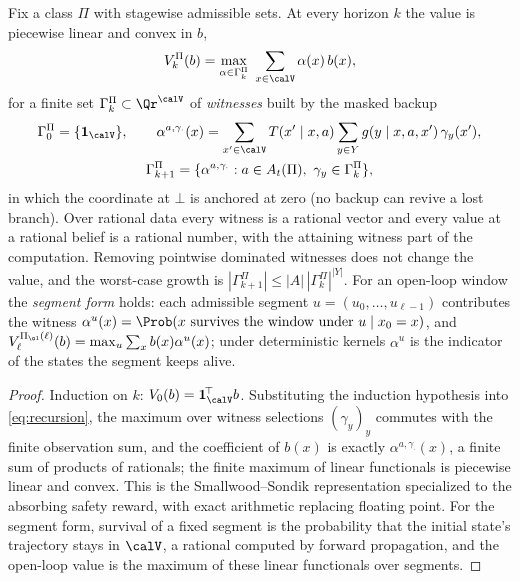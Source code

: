 \begin{proposition}\label{prop:alpha}
Fix a class $\Pi$ with stagewise admissible sets. At every horizon $k$ the value is piecewise linear and convex in $b$,
\[
V^{\Pi}_k(b)=\max_{\alpha\in\Gamma^{\Pi}_k}\ \sum_{x\in\calV}\alpha(x)\,b(x),
\]
for a finite set $\Gamma^{\Pi}_k\subset\Qr^{\calV}$ of \emph{witnesses} built by the masked backup
\begin{equation}\label{eq:backup}
\begin{gathered}
\Gamma^{\Pi}_0=\{\mathbf 1_{\calV}\},\qquad
\alpha^{a,\gamma_{\cdot}}(x)=\sum_{x'\in\calV}T(x'\mid x,a)\sum_{y\in Y}g(y\mid x,a,x')\,\gamma_y(x'),\\
\Gamma^{\Pi}_{k+1}=\{\alpha^{a,\gamma_{\cdot}}:a\in A_t(\Pi),\ \gamma_y\in\Gamma^{\Pi}_k\},
\end{gathered}
\end{equation}
in which the coordinate at $\bot$ is anchored at zero (no backup can revive a lost branch). Over rational data every witness is a rational vector and every value at a rational belief is a rational number, with the attaining witness part of the computation. Removing pointwise dominated witnesses does not change the value, and the worst-case growth is $|\Gamma^{\Pi}_{k+1}|\le|A|\,|\Gamma^{\Pi}_k|^{|Y|}$. For an open-loop window the \emph{segment form} holds: each admissible segment $u=(u_0,\dots,u_{\ell-1})$ contributes the witness $\alpha^{u}(x)=\Prob(x\text{ survives the window under }u\mid x_0=x)$, and $V^{\Pi_{\ol}(\ell)}_{\ell}(b)=\max_u\sum_x b(x)\alpha^u(x)$; under deterministic kernels $\alpha^u$ is the indicator of the states the segment keeps alive.
\end{proposition}

\begin{proof}
Induction on $k$: $V_0(b)=\mathbf 1_{\calV}^{\!\top}b$. Substituting the induction hypothesis into \eqref{eq:recursion}, the maximum over witness selections $(\gamma_y)_y$ commutes with the finite observation sum, and the coefficient of $b(x)$ is exactly $\alpha^{a,\gamma_\cdot}(x)$, a finite sum of products of rationals; the finite maximum of linear functionals is piecewise linear and convex. This is the Smallwood--Sondik representation \cite{SmallwoodSondik1973} specialized to the absorbing safety reward, with exact arithmetic replacing floating point. For the segment form, survival of a fixed segment is the probability that the initial state's trajectory stays in $\calV$, a rational computed by forward propagation, and the open-loop value is the maximum of these linear functionals over segments.
\end{proof}

